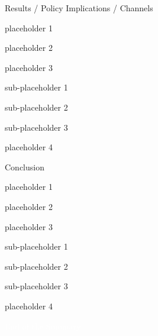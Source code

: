 \begin{frame}{Results / Policy Implications / Channels}
  \begin{wideitemize}
    \item placeholder 1
    \item placeholder 2
    \item placeholder 3
      
      \begin{wideitemize}
    		\item sub-placeholder 1
    		\item sub-placeholder 2
    		\item sub-placeholder 3
  	  \end{wideitemize}
  	
  	\item placeholder 4
  \end{wideitemize}
\end{frame}
\begin{frame}{Conclusion}
  \begin{wideitemize}
    \item placeholder 1
    \item placeholder 2
    \item placeholder 3
      
      \begin{wideitemize}
    		\item sub-placeholder 1
    		\item sub-placeholder 2
    		\item sub-placeholder 3
  	  \end{wideitemize}
  	
  	\item placeholder 4
  \end{wideitemize}
\end{frame}

\begin{transitionframe}
\vspace*{3em}
  \begin{center}
    { \LARGE \textcolor{white}{End of the Summary}}
  \end{center}
\end{transitionframe}



